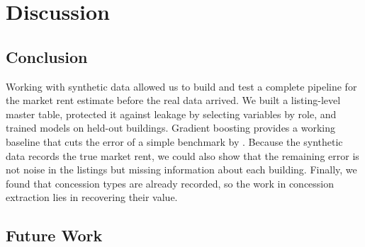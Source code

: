 \section{Discussion}\label{sec:discussion}


\subsection{Conclusion}

Working with synthetic data allowed us to build and test a complete pipeline for the market rent
estimate before the real data arrived. We built a listing-level master table, protected it against
leakage by selecting variables by role, and trained models on held-out buildings. Gradient boosting
provides a working baseline that cuts the error of a simple benchmark by \errorReduction{}. Because
the synthetic data records the true market rent, we could also show that the remaining error is not
noise in the listings but missing information about each building. Finally, we found that
concession types are already recorded, so the work in concession extraction lies in recovering their
value. 


\subsection{Future Work}

